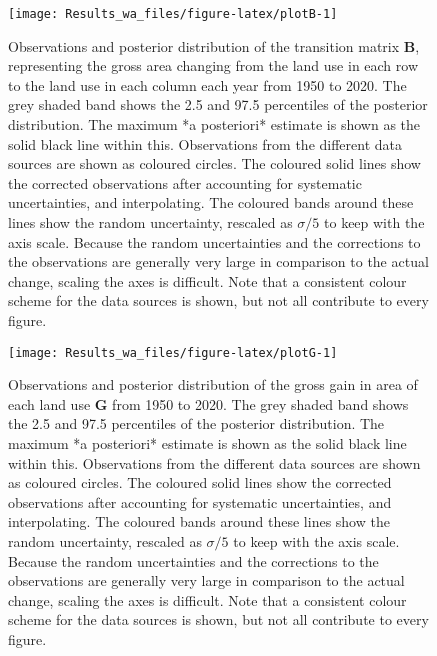 \documentclass[
]{book}
\begin{document}
\begin{figure}
\texttt{[image: Results\_wa\_files/figure-latex/plotB-1]} \caption{ Observations and posterior distribution of the transition matrix $\mathbf{B}$, representing the gross area changing from the land use in each row to the land use in each column each year from 1950 to 2020. The grey shaded band shows the 2.5 and 97.5 percentiles of the posterior distribution. The maximum *a posteriori* estimate is shown as the solid black line within this. Observations from the different data sources are shown as coloured circles. The coloured solid lines show the corrected observations after accounting for systematic uncertainties, and interpolating. The coloured bands around these lines show the random uncertainty, rescaled as $\sigma /5$ to keep with the axis scale. Because the random uncertainties and the corrections to the observations are generally very large in comparison to the actual change, scaling the axes is difficult. Note that a consistent colour scheme for the data sources is shown, but not all contribute to every figure.}\label{fig:plotB}
\end{figure}

\begin{figure}
\texttt{[image: Results\_wa\_files/figure-latex/plotG-1]} \caption{ Observations and posterior distribution of the gross gain in area of each land use $\mathbf{G}$ from 1950 to 2020.  The grey shaded band shows the 2.5 and 97.5 percentiles of the posterior distribution. The maximum *a posteriori* estimate is shown as the solid black line within this. Observations from the different data sources are shown as coloured circles. The coloured solid lines show the corrected observations after accounting for systematic uncertainties, and interpolating. The coloured bands around these lines show the random uncertainty, rescaled as $\sigma /5$ to keep with the axis scale. Because the random uncertainties and the corrections to the observations are generally very large in comparison to the actual change, scaling the axes is difficult. Note that a consistent colour scheme for the data sources is shown, but not all contribute to every figure.}\label{fig:plotG}
\end{figure}
\end{document}
